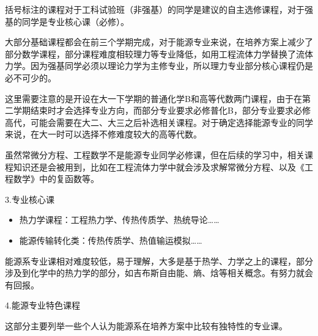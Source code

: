\documentclass[11pt,oneside]{book}
\begin{document}
括号标注的课程对于工科试验班（非强基）的同学是建议的自主选修课程，对于强基的同学是专业核心课（必修）。

\vspace{10pt}

大部分基础课程都会在前三个学期完成，对于能源专业来说，在培养方案上减少了部分数学课程，部分课程难度相较理力等专业降低，如用工程流体力学替换了流体力学。因为强基同学必须以理论力学为主修专业，所以理力专业部分核心课程仍是必不可少的。

\vspace{10pt}

这里需要注意的是开设在大一下学期的普通化学B和高等代数两门课程，由于在第二学期结束时才会选择专业方向，而部分专业要求必修普化B，部分专业要求必修高代，可能会需要在大二、大三之后补选相关课程。对于确定选择能源专业的同学来说，在大一时可以选择不修难度较大的高等代数。

\vspace{10pt}

虽然常微分方程、工程数学不是能源专业同学必修课，但在后续的学习中，相关课程知识还是会被用到，比如在工程流体力学中就会涉及求解常微分方程、以及《工程数学》中的复函数等。

\vspace{10pt}

3.专业核心课
\begin{itemize}
    \item 热力学课程：工程热力学、传热传质学、热统导论……

    \item 能源传输转化类：传热传质学、热值输运模拟……

\end{itemize}


能源系专业课相对难度较低，易于理解，大多是基于热学、力学之上的课程，部分涉及到化学中的热力学的部分，如吉布斯自由能、熵、焓等相关概念。有努力就会有回报。

\vspace{10pt}

4.能源专业特色课程

这部分主要列举一些个人认为能源系在培养方案中比较有独特性的专业课。
\end{document}
